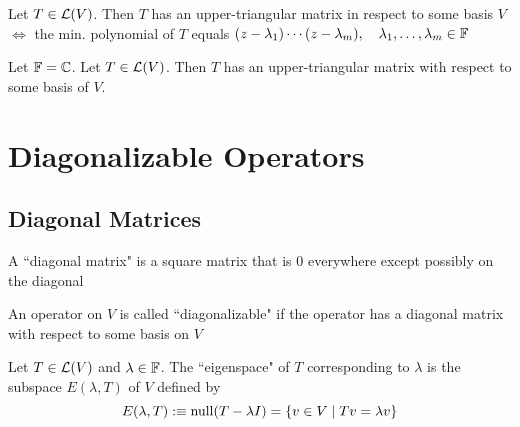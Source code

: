 \setcounter{thm}{43}
\begin{thm}
  \label{necessary and sufficient condition to have an upper-triangular-matrix}
  Let $T\in \mathcal{L}(V)$\footnotemark[1]. Then $T$ has an upper-triangular matrix in respect to some basis $V$ $\iff$ the min. polynomial of $T$ equals $(z-\lambda_1) \cdots (z-\lambda_m), \quad \lambda_1, \dots, \lambda_m \in \mathbb{F}$
\end{thm}

\begin{thm}
  \label{If-F-equals-C-every-operator-on-V-has-an-upper-triangular-matrix}
  Let $\mathbb{F} = \mathbb{C}$. Let $T\in \mathcal{L} (V)$\footnotemark[1]. Then $T$ has an upper-triangular matrix with respect to some basis of $V$.
\end{thm}

\setcounter{footnote}{1}

\pagebreak

\section{Diagonalizable Operators}
\subsection{Diagonal Matrices}

\setcounter{thm}{47}
\begin{mydef}
  A ``diagonal matrix" is a square matrix that is $0$ everywhere except possibly on \nopagebreak the diagonal
\end{mydef}

\setcounter{thm}{49}
\begin{mydef}
  An operator on $V$ is called ``diagonalizable" if the operator has a diagonal matrix with respect to some basis on $V$
\end{mydef}

\setcounter{thm}{51}
\label{eigenspace}
\begin{mydef}
  Let $T \in \mathcal{L}(V)$ and $\lambda \in \mathbb{F}$. The ``eigenspace" of $T$ corresponding to $\lambda$ is the subspace $E(\lambda, T)$ of $V$ defined by
  \begin{equation}
    E(\lambda, T) :\equiv  \operatorname{null}(T-\lambda I) = \{ v\in V \mid Tv = \lambda v\}
  \end{equation}
\end{mydef}

